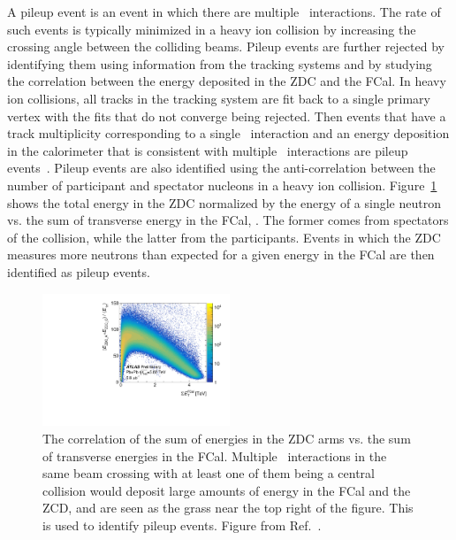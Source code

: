 
A pileup event is an event in which there are multiple \pbpb\ interactions.
The rate of such events is typically minimized in a heavy ion collision by increasing the crossing angle between the colliding beams.
Pileup events are further rejected by identifying them using information from the tracking systems and by studying the correlation between the energy deposited in the ZDC and the FCal.
In heavy ion collisions, all tracks in the tracking system are fit back to a single primary vertex with the fits that do not converge being rejected.
Then events that have a track multiplicity corresponding to a single \pbpb\ interaction and an energy deposition in the calorimeter that is consistent with multiple \pbpb\ interactions are pileup events~\cite{Aad2014}.
Pileup events are also identified using the anti-correlation between the number of participant and spectator nucleons in a heavy ion collision.
Figure~\ref{fig:zdc_fcal} shows the total energy in the ZDC normalized by the energy of a single neutron vs. the sum of transverse energy in the FCal, \ETfcal.
The former comes from spectators of the collision, while the latter from the participants.
Events in which the ZDC measures more neutrons than expected for a given energy in the FCal are then identified as pileup events.

\begin{figure}[ht]
	\centering
        \includegraphics[width=0.5\textwidth]{figures/setup/zdc_fcal}
          \caption{The correlation of the sum of energies in the ZDC arms vs. the sum of transverse energies in the FCal.
          Multiple \pbpb\ interactions in the same beam crossing with at least one of them being a central collision would deposit large amounts of energy in the FCal and the ZCD, and are seen as the grass near the top right of the figure.
          This is used to identify pileup events.
           Figure from Ref.~\cite{perfPlots}.}
          \label{fig:zdc_fcal}
\end{figure}



